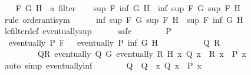 \begin{isabellebody}
%
\isadelimproof
%
\endisadelimproof
%
\isatagproof
{}\isamarkupfalse%
\isanewline
\ \ \isamarkupfalse%
\ F\ G\ H\ {\isacharcolon}{\kern0pt}{\isacharcolon}{\kern0pt}\ {\isachardoublequoteopen}{\isacharprime}{\kern0pt}a\ filter{\isachardoublequoteclose}\isanewline
\ \ \isamarkupfalse%
\ {\isachardoublequoteopen}sup\ F\ {\isacharparenleft}{\kern0pt}inf\ G\ H{\isacharparenright}{\kern0pt}\ {\isacharequal}{\kern0pt}\ inf\ {\isacharparenleft}{\kern0pt}sup\ F\ G{\isacharparenright}{\kern0pt}\ {\isacharparenleft}{\kern0pt}sup\ F\ H{\isacharparenright}{\kern0pt}{\isachardoublequoteclose}\isanewline
\ \ \isamarkupfalse%
\ {\isacharparenleft}{\kern0pt}rule\ order{\isachardot}{\kern0pt}antisym{\isacharparenright}{\kern0pt}\isanewline
\ \ \ \ \isamarkupfalse%
\ {\isachardoublequoteopen}inf\ {\isacharparenleft}{\kern0pt}sup\ F\ G{\isacharparenright}{\kern0pt}\ {\isacharparenleft}{\kern0pt}sup\ F\ H{\isacharparenright}{\kern0pt}\ {\isasymle}\ sup\ F\ {\isacharparenleft}{\kern0pt}inf\ G\ H{\isacharparenright}{\kern0pt}{\isachardoublequoteclose}\ \isanewline
\ \ \ \ \ \ \isamarkupfalse%
\ le{\isacharunderscore}{\kern0pt}filter{\isacharunderscore}{\kern0pt}def\ eventually{\isacharunderscore}{\kern0pt}sup\isanewline
\ \ \ \ \isamarkupfalse%
\ safe\isanewline
\ \ \ \ \ \ \isamarkupfalse%
\ P\ \isamarkupfalse%
\ {}{\isacharcolon}{\kern0pt}\ {\isachardoublequoteopen}eventually\ P\ F{\isachardoublequoteclose}\ \ {}{\isacharcolon}{\kern0pt}\ {\isachardoublequoteopen}eventually\ P\ {\isacharparenleft}{\kern0pt}inf\ G\ H{\isacharparenright}{\kern0pt}{\isachardoublequoteclose}\isanewline
\ \ \ \ \ \ \isamarkupfalse%
\ {}\ \isamarkupfalse%
\ Q\ R\ \isanewline
\ \ \ \ \ \ \ \ \ QR{\isacharcolon}{\kern0pt}\ {\isachardoublequoteopen}eventually\ Q\ G{\isachardoublequoteclose}\ {\isachardoublequoteopen}eventually\ R\ H{\isachardoublequoteclose}\ {\isachardoublequoteopen}{\isasymAnd}x{\isachardot}{\kern0pt}\ Q\ x\ {\isasymLongrightarrow}\ R\ x\ {\isasymLongrightarrow}\ P\ x{\isachardoublequoteclose}\isanewline
\ \ \ \ \ \ \ \ \isamarkupfalse%
\ {\isacharparenleft}{\kern0pt}auto\ simp{\isacharcolon}{\kern0pt}\ eventually{\isacharunderscore}{\kern0pt}inf{\isacharparenright}{\kern0pt}\isanewline
\ \ \ \ \ \ \isamarkupfalse%
\ Q{\isacharprime}{\kern0pt}\ \ {\isachardoublequoteopen}Q{\isacharprime}{\kern0pt}\ {\isacharequal}{\kern0pt}\ {\isacharparenleft}{\kern0pt}{\isasymlambda}x{\isachardot}{\kern0pt}\ Q\ x\ {\isasymor}\ P\ x{\isacharparenright}{\kern0pt}{\isachardoublequoteclose}\isanewline

\end{isabellebody}
